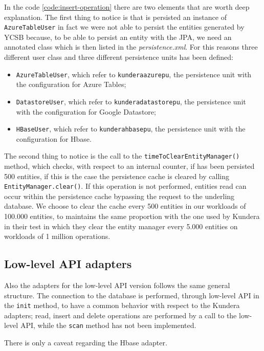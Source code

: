 \noindent In the code \ref{code:insert-operation} there are two elements that are worth deep explanation. The first thing to notice is that is persisted an instance of \texttt{AzureTableUser} in fact we were not able to persist the entities generated by YCSB because, to be able to persist an entity with the JPA, we need an annotated class which is then listed in the \textit{persistence.xml}. For this reasons three different user class and three different persistence units has been defined:
\begin{itemize}
\item \texttt{AzureTableUser}, which refer to \texttt{kundera\textunderscore azure\textunderscore pu}, the persistence unit with the configuration for Azure Tables;
\item \texttt{DatastoreUser}, which refer to \texttt{kundera\textunderscore datastore\textunderscore pu}, the persistence unit with the configuration for Google Datastore;
\item \texttt{HBaseUser}, which refer to \texttt{kundera\textunderscore hbase\textunderscore pu}, the persistence unit with the configuration for Hbase.
\end{itemize} 
\noindent The second thing to notice is the call to the \texttt{timeToClearEntityManager()} method, which checks, with respect to an internal counter, if has been persisted 500 entities, if this is the case the persistence cache is cleared by calling \texttt{EntityManager.clear()}. If this operation is not performed, entities read can occur within the persistence cache bypassing the request to the underling database. We choose to clear the cache every 500 entities in our workloads of 100.000 entities, to maintains the same proportion with the one used by Kundera in their test in which they clear the entity manager every 5.000 entities on workloads of 1 million operations.

\subsection{Low-level API adapters}
Also the adapters for the low-level API version follows the same general structure. The connection to the database is performed, through low-level API in the \texttt{init} method, to have a common behavior with respect to the Kundera adapters; read, insert and delete operations are performed by a call to the low-level API, while the \texttt{scan} method has not been implemented.

\newparagraph There is only a caveat regarding the Hbase adapter.

